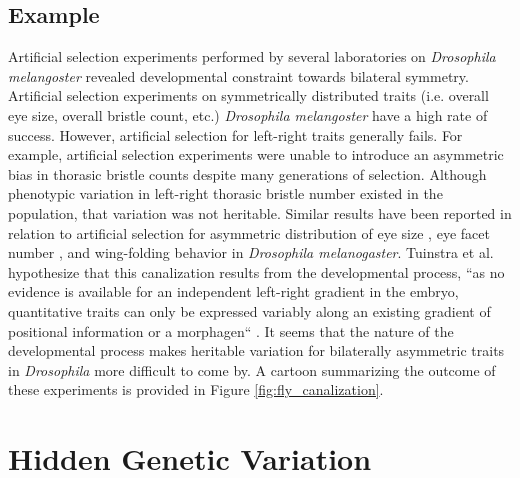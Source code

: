 \subsection{Example} \label{sec:fly_symmetry}
Artificial selection experiments performed by several laboratories on \textit{Drosophila melangoster} revealed developmental constraint towards bilateral symmetry.
Artificial selection experiments on symmetrically distributed traits (i.e. overall eye size, overall bristle count, etc.) \textit{Drosophila melangoster} have a high rate of success.
However, artificial selection for left-right traits generally fails. 
For example, artificial selection experiments were unable to introduce an asymmetric bias in thorasic bristle counts despite many generations of selection.
Although phenotypic variation in left-right thorasic bristle number existed in the population, that variation was not heritable.
Similar results have been reported in relation to artificial selection for asymmetric distribution of eye size \cite{Coyne1987LackMelanogaster}, eye facet number \cite{ManyardSmith1960ThePattern}, and wing-folding behavior \cite{Purnell1973SelectionMelanogaster} in \textit{Drosophila melanogaster}.
Tuinstra et al. hypothesize that this canalization results from the developmental process, ``as no evidence is available for an independent left-right gradient in the embryo, quantitative traits can only be expressed variably along an existing gradient of positional information or a morphagen`` \cite{Tuinstra1990LackDevelopment}.
It seems that the nature of the developmental process makes heritable variation for bilaterally asymmetric traits in \textit{Drosophila} more difficult to come by.
A cartoon summarizing the outcome of these experiments  is provided in Figure \ref{fig:fly_canalization}.

\section{Hidden Genetic Variation} \label{sec:hidden_genetic_variation}
